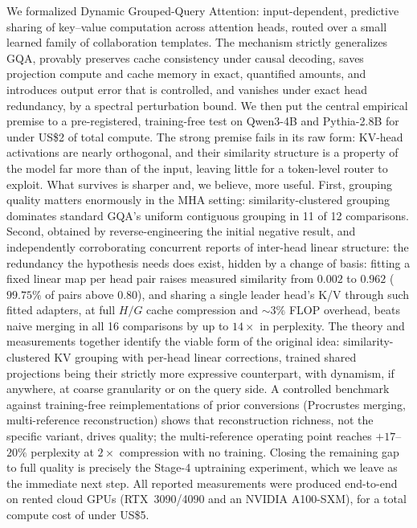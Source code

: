 \documentclass{article}
\begin{document}
We formalized Dynamic Grouped-Query Attention: input-dependent, predictive
sharing of key--value computation across attention heads, routed over a
small learned family of collaboration templates. The mechanism strictly
generalizes GQA, provably preserves cache consistency under causal decoding,
saves projection compute and cache memory in exact, quantified amounts, and
introduces output error that is controlled, and vanishes under exact head
redundancy, by a spectral perturbation bound. We then put the central
empirical premise to a pre-registered, training-free test on Qwen3-4B and
Pythia-2.8B for under US\$2 of total compute. The strong premise fails in
its raw form: KV-head activations are nearly orthogonal, and their
similarity structure is a property of the model far more than of the
input, leaving little for a token-level router to exploit. What survives
is sharper and, we believe, more useful. First, grouping quality matters
enormously in the MHA setting: similarity-clustered grouping dominates
standard GQA's uniform contiguous grouping in 11 of 12 comparisons.
Second, obtained by reverse-engineering the initial negative result, and
independently corroborating concurrent reports of inter-head linear
structure: the redundancy the hypothesis needs does exist, hidden by a
change of basis: fitting a fixed
linear map per head pair raises measured similarity from $0.002$ to
$0.962$ ($99.75\%$ of pairs above $0.80$), and sharing a single leader
head's K/V through such fitted adapters, at full $H/G$ cache compression
and $\sim 3\%$ FLOP overhead, beats naive merging in all 16 comparisons by
up to $14\times$ in perplexity. The theory and measurements together
identify the viable form of the original idea: similarity-clustered KV
grouping with per-head linear corrections, trained shared projections
being their strictly more expressive counterpart, with dynamism, if
anywhere, at coarse granularity or on the query side. A controlled benchmark against training-free reimplementations of prior conversions (Procrustes merging, multi-reference reconstruction) shows that reconstruction richness, not the specific variant, drives quality; the multi-reference operating point reaches $+17$--$20\%$ perplexity at $2\times$ compression with no training. Closing the remaining gap to full quality is precisely the Stage-4 uptraining experiment, which we leave as the immediate next step. All reported measurements were produced end-to-end on rented cloud GPUs (RTX~3090/4090 and an NVIDIA A100-SXM), for a total compute cost of under US\$5.



\end{document}
